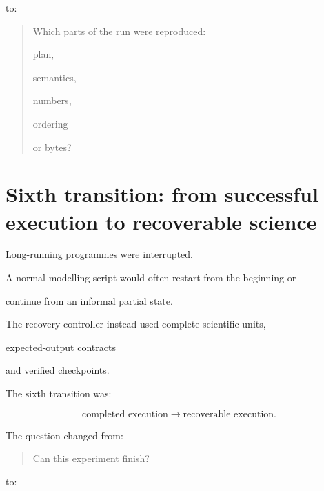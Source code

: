 \documentclass[11pt,a4paper,oneside]{report}
\begin{document}
to:



\begin{quote}



Which parts of the run were reproduced:

plan,

semantics,

numbers,

ordering

or bytes?



\end{quote}





\section{Sixth transition: from successful execution to recoverable science}



Long-running programmes were interrupted.



A normal modelling script would often restart from the beginning or

continue from an informal partial state.



The recovery controller instead used complete scientific units,

expected-output contracts

and verified checkpoints.



The sixth transition was:



\begin{equation}
\text{completed execution}
\rightarrow
\text{recoverable execution}.
\end{equation}



The question changed from:



\begin{quote}



Can this experiment finish?



\end{quote}



to:
\end{document}
